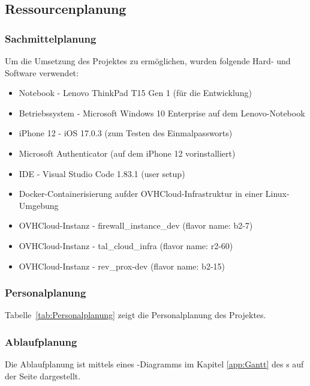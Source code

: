 \subsection{Ressourcenplanung}
\label{sec:Ressourcenplanung}

\subsubsection{Sachmittelplanung}
\label{sec:Sachmittelplanung}
Um die Umsetzung des Projektes zu ermöglichen, wurden folgende Hard- und Software verwendet:
\begin{itemize} [label=--]
	\item Notebook - Lenovo ThinkPad T15 Gen 1 (für die Entwicklung)
	\item Betriebssystem - Microsoft Windows 10 Enterprise auf dem Lenovo-Notebook
	\item iPhone 12 - iOS 17.0.3 (zum Testen des Einmalpassworts)
	\item Microsoft Authenticator (auf dem iPhone 12 vorinstalliert)
	\item IDE - Visual Studio Code 1.83.1 (user setup)
	\item Docker-Containerisierung aufder OVHCloud-Infrastruktur in einer Linux-Umgebung
	\item OVHCloud-Instanz - firewall\_instance\_dev (flavor name: b2-7)
	\item OVHCloud-Instanz - tal\_cloud\_infra (flavor name: r2-60)
	\item OVHCloud-Instanz - rev\_prox-dev (flavor name: b2-15)
\end{itemize}

\subsubsection{Personalplanung}
\label{sec:Personalplanung}
Tabelle~\ref{tab:Personalplanung} zeigt die Personalplanung des Projektes.

\subsubsection{Ablaufplanung}
\label{sec:Ablaufplaung und Meilensteine}
Die Ablaufplanung ist mittels eines -Diagramms im Kapitel \ref{app:Gantt} des s 
auf der Seite \pageref{app:Gantt} dargestellt.

